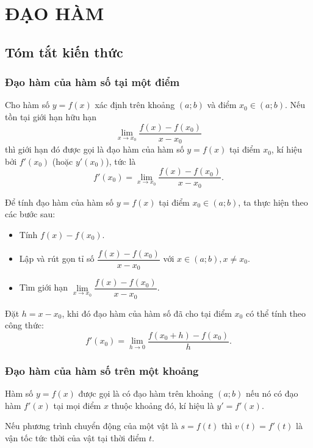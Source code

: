 \setcounter{section}{30}
\section{ĐẠO HÀM}
\subsection{Tóm tắt kiến thức}
\begin{tomtat}
	\subsubsection{Đạo hàm của hàm số tại một điểm}
	\begin{dn}
	Cho hàm số $y=f(x)$ xác định trên khoảng $(a;b)$ và điểm $x_0 \in (a;b)$.
	Nếu tồn tại giới hạn hữu hạn 
	\[\lim\limits_{x \to x_0} \dfrac{f(x)-f(x_0)}{x-x_0}\]
	thì giới hạn đó được gọi là đạo hàm của hàm số $y=f(x)$ tại điểm $x_0$, kí hiệu bởi $f'(x_0)$ (hoặc $y'(x_0)$), tức là 
	\[f'(x_0)=\lim\limits_{x \to x_0} \dfrac{f(x)-f(x_0)}{x-x_0}.\]
	\end{dn}
	\begin{note}
	Để tính đạo hàm của hàm số $y=f(x)$ tại điểm $x_0\in (a;b)$, ta thực hiện theo các bước sau:
	\begin{itemize}
	\item Tính $f(x)-f(x_0)$.
	\item Lập và rút gọn tỉ số $\dfrac{f(x)-f(x_0)}{x-x_0}$ với $x \in (a;b),x \ne x_0$.
	\item Tìm giới hạn $\lim\limits_{x \to x_0} \dfrac{f(x)-f(x_0)}{x-x_0}$.
	\end{itemize}
	\end{note}
	\begin{note}
	Đặt $h=x-x_0$, khi đó đạo hàm của hàm số đã cho tại điểm $x_0$ có thể tính theo công thức:\\
	$$f'(x_0)=\lim\limits_{h \to 0} \dfrac{f(x_0+h)-f(x_0)}{h}.$$
	\end{note}
	\subsubsection{Đạo hàm của hàm số trên một khoảng}
	\begin{dn}
	Hàm số $y=f(x)$ được gọi là có đạo hàm trên khoảng $(a;b)$ nếu nó có đạo hàm $f'(x)$ tại mọi điểm $x$ thuộc khoảng đó, kí hiệu là $y'=f'(x)$.
	\end{dn}	
	\begin{note}
	Nếu phương trình chuyển động của một vật là $s=f(t)$ thì $v(t)=f'(t)$ là vận tốc tức thời của vật tại thời điểm $t$.
	\end{note}

\end{tomtat}
